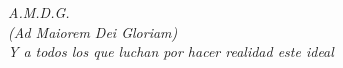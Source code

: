 \vspace*{\fill}
\begin{flushright}
	\emph{\textrm{A.M.D.G.}}\\
	\emph{\textrm{(Ad Maiorem Dei Gloriam)}} \\

	\emph{\textrm{Y a todos los que luchan por hacer realidad este ideal}}
\end{flushright}
\vspace*{\fill}
